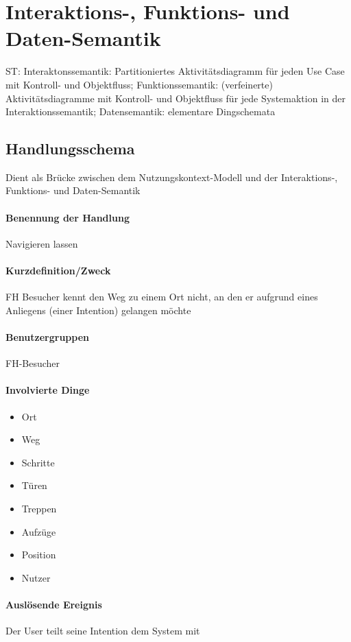 \chapter{Interaktions-, Funktions- und Daten-Semantik}
ST: Interaktonssemantik: Partitioniertes Aktivitätsdiagramm für jeden Use
Case mit Kontroll- und Objektfluss;
Funktionssemantik: (verfeinerte) Aktivitätsdiagramme mit Kontroll- und
Objektfluss für jede Systemaktion in der Interaktionssemantik;
Datensemantik: elementare Dingschemata

\section{Handlungsschema}
Dient als Brücke zwischen dem Nutzungskontext-Modell und der Interaktions-, Funktions- und Daten-Semantik

\subsubsection*{Benennung der Handlung}
Navigieren lassen
\subsubsection*{Kurzdefinition/Zweck}
FH Besucher kennt den Weg zu einem Ort nicht, an den er aufgrund eines Anliegens (einer Intention) gelangen möchte
\subsubsection*{Benutzergruppen}
FH-Besucher
\subsubsection*{Involvierte Dinge}
\begin{multicols}{4}
\begin{itemize}
\item Ort
\item Weg
\item Schritte
\item Türen
\item Treppen
\item Aufzüge
\item Position
\item Nutzer
\end{itemize}
\end{multicols}

\subsubsection*{Auslösende Ereignis}
Der User teilt seine Intention dem System mit 
